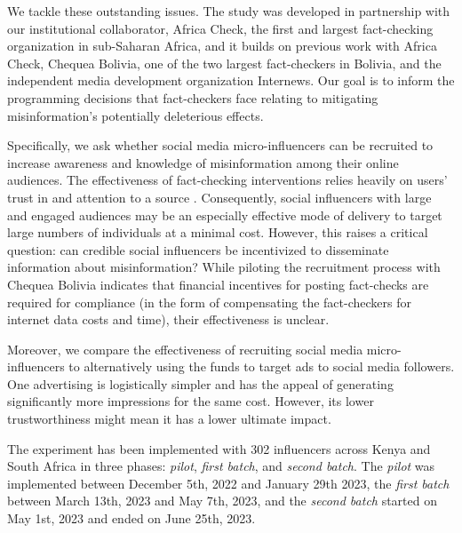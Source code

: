 We tackle these outstanding issues. The study  was developed in partnership with our institutional collaborator, Africa Check, the first and largest fact-checking organization in sub-Saharan Africa, and it builds on previous work with Africa Check, Chequea Bolivia, one of the two largest fact-checkers in Bolivia, and the independent media development organization Internews. Our goal is to inform the programming decisions that fact-checkers face relating to mitigating misinformation's potentially deleterious effects. 

Specifically, we ask whether social media micro-influencers can be recruited to increase awareness and knowledge of misinformation among their online audiences. The effectiveness of fact-checking interventions relies heavily on users' trust in and attention to a source \citep{bowlesetal2020}. Consequently, social influencers with large and engaged audiences may be an especially effective mode of delivery to target large numbers of individuals at a minimal cost. However, this raises a critical question: can credible social influencers be incentivized to disseminate information about misinformation? While piloting the recruitment process with Chequea Bolivia indicates that financial incentives for posting fact-checks are required for compliance (in the form of compensating the fact-checkers for internet data costs and time), their effectiveness is unclear. 

Moreover, we compare the effectiveness of recruiting social media micro-influencers to alternatively using the funds to target ads to social media followers. One advertising is logistically simpler and has the appeal of generating significantly more impressions for the same cost. However, its lower trustworthiness might mean it has a lower ultimate impact. 

The experiment has been implemented with 302 influencers across Kenya and South Africa in three phases: \textit{pilot}, \textit{first batch}, and \textit{second batch}. The \textit{pilot} was implemented between December 5th, 2022 and January 29th 2023, the \textit{first batch} between March 13th, 2023 and May 7th, 2023, and the \textit{second batch} started on May 1st, 2023 and ended on June 25th, 2023.

